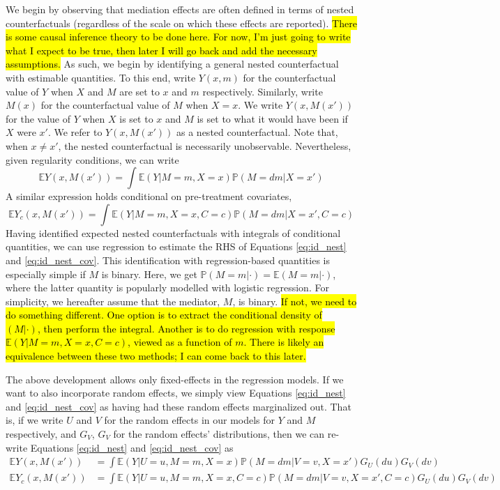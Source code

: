 \documentclass{article}
\newcommand{\bP}{\mathbb{P}}
\newcommand{\bE}{\mathbb{E}}
\begin{document}
We begin by observing that mediation effects are often defined in terms of nested counterfactuals (regardless of the scale on which these effects are reported). \hl{There is some causal inference theory to be done here. For now, I'm just going to write what I expect to be true, then later I will go back and add the necessary assumptions.} As such, we begin by identifying a general nested counterfactual with estimable quantities. To this end, write $Y(x, m)$ for the counterfactual value of $Y$ when $X$ and $M$ are set to $x$ and $m$ respectively. Similarly, write $M(x)$ for the counterfactual value of $M$ when $X=x$. We write $Y(x, M(x'))$ for the value of $Y$ when $X$ is set to $x$ and $M$ is set to what it would have been if $X$ were $x'$. We refer to $Y(x, M(x'))$ as a nested counterfactual. Note that, when $x \neq x'$, the nested counterfactual is necessarily unobservable. Nevertheless, given regularity conditions, we can write
%
\begin{equation}
    \bE Y(x, M(x')) = \int \bE(Y | M=m, X=x) \bP(M = dm | X = x') \label{eq:id_nest}
\end{equation}
%
A similar expression holds conditional on pre-treatment covariates,
\begin{equation}
    \bE Y_c(x, M(x')) = \int \bE(Y | M=m, X=x, C=c) \bP(M = dm | X = x', C=c) \label{eq:id_nest_cov}
\end{equation}
%
Having identified expected nested counterfactuals with integrals of conditional quantities, we can use regression to estimate the RHS of Equations \ref{eq:id_nest} and \ref{eq:id_nest_cov}. This identification with regression-based quantities is especially simple if $M$ is binary. Here, we get $\bP(M=m | \cdot) = \bE(M=m | \cdot)$, where the latter quantity is popularly modelled with logistic regression. For simplicity, we hereafter assume that the mediator, $M$, is binary. \hl{If not, we need to do something different. One option is to extract the conditional density of $(M | \cdot)$, then perform the integral. Another is to do regression with response $\bE(Y | M=m, X=x, C=c)$, viewed as a function of $m$. There is likely an equivalence between these two methods; I can come back to this later.}

The above development allows only fixed-effects in the regression models. If we want to also incorporate random effects, we simply view Equations \ref{eq:id_nest} and \ref{eq:id_nest_cov} as having had these random effects marginalized out. That is, if we write $U$ and $V$ for the random effects in our models for $Y$ and $M$ respectively, and $G_V$, $G_V$ for the random effects' distributions, then we can re-write Equations \ref{eq:id_nest} and \ref{eq:id_nest_cov} as
%
\begin{align}
    \bE Y(x, M(x')) &= \int \bE(Y | U=u, M=m, X=x) \bP(M = dm |V=v, X = x') G_U(du) G_V(dv) \label{eq:ran_id_nest} \\
    \bE Y_c(x, M(x')) &= \int \bE(Y | U=u, M=m, X=x, C=c) \bP(M = dm | V=v, X = x', C=c) G_U(du) G_V(dv) \label{eq:ran_id_nest_cov}
\end{align}
\end{document}
